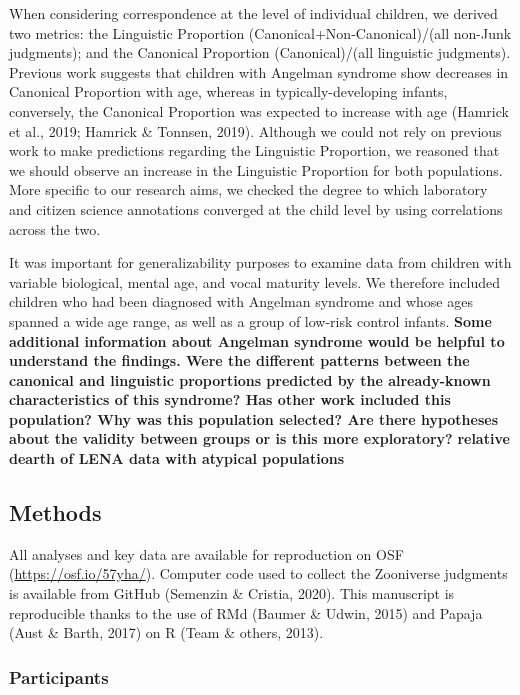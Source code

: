 \documentclass[english,,man]{apa6}
\begin{document}
When considering correspondence at the level of individual children, we derived two metrics: the Linguistic Proportion (Canonical+Non-Canonical)/(all non-Junk judgments); and the Canonical Proportion (Canonical)/(all linguistic judgments). Previous work suggests that children with Angelman syndrome show decreases in Canonical Proportion with age, whereas in typically-developing infants, conversely, the Canonical Proportion was expected to increase with age (Hamrick et al., 2019; Hamrick \& Tonnsen, 2019). Although we could not rely on previous work to make predictions regarding the Linguistic Proportion, we reasoned that we should observe an increase in the Linguistic Proportion for both populations. More specific to our research aims, we checked the degree to which laboratory and citizen science annotations converged at the child level by using correlations across the two.

It was important for generalizability purposes to examine data from children with variable biological, mental age, and vocal maturity levels. We therefore included children who had been diagnosed with Angelman syndrome and whose ages spanned a wide age range, as well as a group of low-risk control infants. \textbf{Some additional information about Angelman syndrome would be helpful to understand the findings. Were the different patterns between the canonical and linguistic proportions predicted by the already-known characteristics of this syndrome? Has other work included this population? Why was this population selected? Are there hypotheses about the validity between groups or is this more exploratory?} \textbf{relative dearth of LENA data with atypical populations }

\hypertarget{methods}{%
\subsection{Methods}\label{methods}}

All analyses and key data are available for reproduction on OSF (\url{https://osf.io/57yha/}). Computer code used to collect the Zooniverse judgments is available from GitHub (Semenzin \& Cristia, 2020). This manuscript is reproducible thanks to the use of RMd (Baumer \& Udwin, 2015) and Papaja (Aust \& Barth, 2017) on R (Team \& others, 2013).

\hypertarget{participants}{%
\subsubsection{Participants}\label{participants}}
\end{document}
